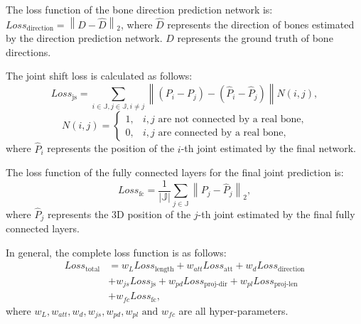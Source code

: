 \documentclass[journal]{IEEEtran}
\begin{document}
The loss function of the bone direction prediction network is:
$
Loss_{\text{direction}} = \left\| D - \hat D \right\|_2
$,
where $\hat D$ represents the direction of bones estimated by the direction prediction network. $D$ represents the ground truth of bone directions. \par
The joint shift loss \cite{2020Anatomy} is calculated as follows:
\begin{equation}
	Loss_{\text{js}} = \sum_{i\in \mathbb J,j\in \mathbb J, i\neq j} 
	\left\| \left( P_i - P_j \right) - \left( \hat P_i - \hat P_j \right) \right\|
	N(i,j),
\end{equation}
\begin{equation}
	N(i,j) = \begin{cases}
		1, & i, j \text{ are not connected by a real bone,}\\
		0, &i, j \text{ are connected by a real bone},
	\end{cases}
\end{equation}
where $\hat P_i$ represents the position of the $i$-th joint estimated by the final network. \par 
The loss function of the fully connected layers for the final joint prediction is:
\begin{equation}
	Loss_{\text{fc}} = \frac{1}{\left| \mathbb J \right|}\sum_{j \in \mathbb J}\left\| P_j - \hat P_{j} \right\|_2,
\end{equation}
where $\hat P_{j} $ represents the 3D position of the $j$-th joint estimated by the final fully connected layers. 

In general, the complete loss function is as follows:
\begin{equation}
	\begin{aligned}
		Loss_{\text{total}} &= w_L Loss_{\text{length}} + w_{att} Loss_{\text{att}} + w_d Loss_{\text{direction}} \\
		&+ w_{js} Loss_{\text{js}} + w_{pd} Loss_{\text{proj-dir}} + w_{pl} Loss_{\text{proj-len}} \\
		&+ w_{fc} Loss_{\text{fc}},
	\end{aligned}
\end{equation}
where $ w_L, w_{att}, w_d, w_{js}, w_{pd}, w_{pl} \text{ and } w_{fc}   $ are all hyper-parameters. 
\end{document}

